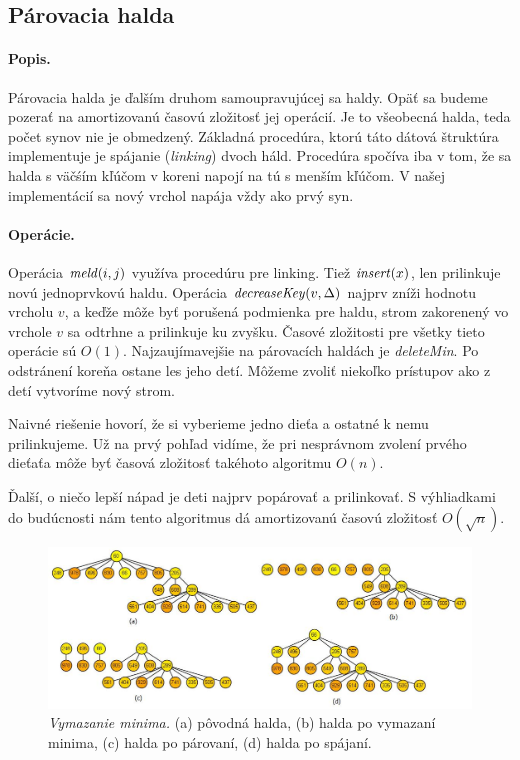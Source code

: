 \subsection{Párovacia halda} 
\paragraph{Popis.}
Párovacia halda je ďalším druhom samoupravujúcej sa haldy. Opäť sa budeme pozerať na amortizovanú časovú zložitosť jej operácií.
Je to všeobecná halda, teda počet synov nie je obmedzený.
Základná procedúra, ktorú táto dátová štruktúra implementuje je spájanie (\emph{linking}) dvoch háld. Procedúra spočíva iba v tom, že sa halda s väčśím kľúčom v koreni napojí na tú s menším kľúčom. V našej implementácií sa nový vrchol napája vždy ako prvý syn.

\paragraph{Operácie.}
Operácia $\mathop{\mathit{meld}}(i,j)$ využíva procedúru pre linking. Tiež $\mathop{\mathit{insert}}(x)$, len prilinkuje novú jednoprvkovú haldu.
Operácia $\mathop{\mathit{decreaseKey}}(v, \Delta)$ najprv zníži hodnotu vrcholu $v$, a keďže môže byť porušená podmienka pre haldu,
strom zakorenený vo vrchole $v$ sa odtrhne a prilinkuje ku zvyšku. Časové zložitosti pre všetky tieto operácie
sú $O(1)$. Najzaujímavejšie na párovacích haldách je \emph{deleteMin}. Po odstránení koreňa ostane les jeho detí.
Môžeme zvoliť niekoľko prístupov ako z detí vytvoríme nový strom.

Naivné riešenie hovorí, že si vyberieme jedno dieťa a ostatné k nemu prilinkujeme. Už na prvý pohľad vidíme,
že pri nesprávnom zvolení prvého dieťaťa môže byť časová zložitosť takéhoto algoritmu $O(n)$.

Ďalší, o niečo lepší nápad je deti najprv popárovať a prilinkovať. S výhliadkami do budúcnosti nám tento algoritmus dá 
amortizovanú časovú zložitosť $O(\sqrt{n})$.

\begin{figure}
\includegraphics[width=\columnwidth]{obrazky/pairdel.png}
\caption{\emph{Vymazanie minima.} 
(a) pôvodná halda, (b) halda po vymazaní minima, (c) halda po párovaní, (d) halda po spájaní.} 
\label{img:pairdel} 
\end{figure}

